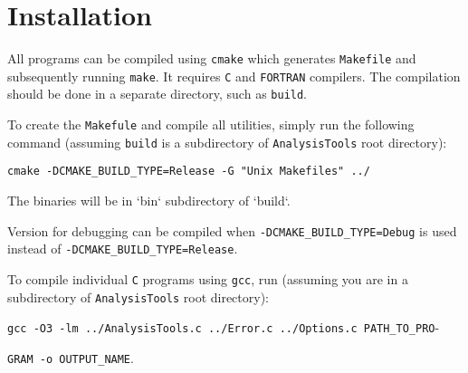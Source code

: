 \chapter{Installation} \label{chap:Install}

All programs can be compiled using \texttt{cmake} which generates
\texttt{Makefile} and subsequently running \texttt{make}. It requires
\texttt{C} and \texttt{FORTRAN} compilers.
The compilation should be done in a separate directory, such as
\texttt{build}.

To create the \texttt{Makefule} and compile all utilities,
simply run the following command (assuming \texttt{build} is a subdirectory
of \texttt{AnalysisTools} root directory):

\vspace{1em}
\noindent
\texttt{cmake -DCMAKE\_BUILD\_TYPE=Release -G "Unix Makefiles" ../}
\vspace{1em}

The binaries will be in `bin` subdirectory of `build`.

Version for debugging can be compiled when
\texttt{-DCMAKE\_BUILD\_TYPE=Debug} is used instead of
\texttt{-DCMAKE\_BUILD\_TYPE=Release}.

To compile individual \texttt{C} programs using \texttt{gcc}, run (assuming
you are in a subdirectory of \texttt{AnalysisTools} root directory):

\vspace{1em}
\noindent
\texttt{gcc -O3 -lm ../AnalysisTools.c ../Error.c ../Options.c
PATH\_TO\_PRO}-

\noindent
\texttt{GRAM -o OUTPUT\_NAME}.
\vspace{1em}

